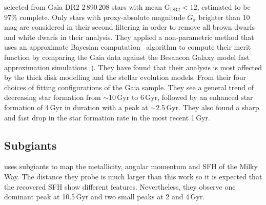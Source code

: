 \documentclass[fleqn,usenatbib]{mnras}
\begin{document}
\textit{\citet{2019A&A...624L...1M}} selected from Gaia DR2 2\,890\,208 stars
with mean G$_{\mathrm{DR2}}<12$, estimated to be $97\%$ complete. Only stars
with proxy-absolute magnitude $G_{\pi}$ brighter than 10 mag are considered in
their second filtering in order to remove all brown dwarfs and white dwarfs in
their analysis. They applied a non-parametric method that uses an approximate
Bayesian computation~\citep{2017A&C....19...16J} algorithm to compute their
merit function by comparing the Gaia data against the Besancon Galaxy model
fast approximation simulations~\citep{2018A&A...620A..79M}). They have found
that their analysis is most affected by the thick disk modelling and the
stellar evolution models. From their four choices of fitting configurations of
the Gaia sample. They see a general trend of decreasing star formation from
$\sim$10\,Gyr to 6\,Gyr, followed by an enhanced star formation of 4\,Gyr in
duration with a peak at $\sim$2.5\,Gyr. They also found a sharp and fast drop
in the star formation rate in the most recent 1\,Gyr.

\subsection{Subgiants}
\citet{2022Natur.603..599X} uses subgiants to map the metallicity, angular
momentum and SFH of the Milky Way. The distance they probe is much larger
than this work so it is expected that the recovered SFH show different
features. Nevertheless, they observe one dominant peak at 10.5\,Gyr and two
small peaks at 2 and 4\,Gyr.
\end{document}
